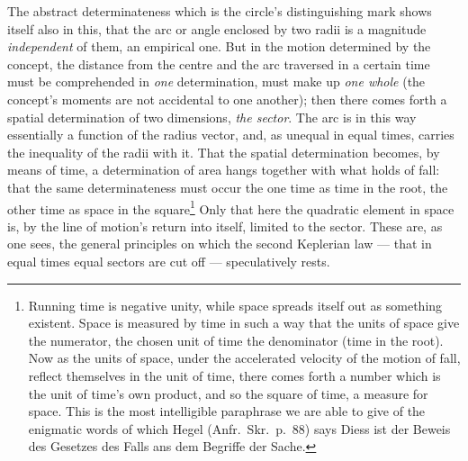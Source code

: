 \documentclass[12pt,a4paper]{book}
\begin{document}
The abstract determinateness which is the circle's distinguishing mark shows itself also in this, that the
arc or angle enclosed by two radii is a magnitude \emph{independent} of them, an empirical one. But in the
motion determined by the concept, the distance from the centre and the arc traversed in a certain time must
be comprehended in \emph{one} determination, must make up \emph{one whole} (the concept's moments are not
accidental to one another); then there comes forth a spatial determination of two dimensions, \emph{the
sector}. The arc is in this way essentially a function of the radius vector, and, as unequal in equal times,
carries the inequality of the radii with it. That the spatial determination becomes, by means of time, a
determination of area hangs together with what holds of fall: that the same determinateness must occur the
one time as time in the root, the other time as space in
the square\footnote{%
Running time is negative unity, while space spreads itself out as something existent. Space is measured by
time in such a way that the units of space give the numerator, the chosen unit of time the denominator (time
in the root). Now as the units of space, under the accelerated velocity of the motion of fall, reflect
themselves in the unit of time, there comes forth a number which is the unit of time's own product, and so
the square of time, a measure for space. This is the most intelligible paraphrase we are able to give of the
enigmatic words of which Hegel (Anfr.\ Skr.\ p.\ 88) says
Diess ist der Beweis des Gesetzes des Falls ans dem Begriffe der Sache.} Only that
here the quadratic element in space is, by the line of motion's return into itself, limited to the sector.
These are, as one sees, the general principles on which the second Keplerian law --- that in equal times
equal sectors are cut off --- speculatively rests.
\end{document}
